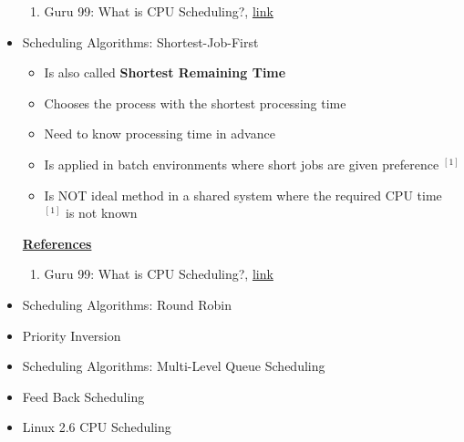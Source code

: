 \documentclass[12pt]{article}
\begin{document}
\begin{itemize}
    \begin{enumerate}[1)]
        \item Guru 99: What is CPU Scheduling?, \href{https://www.guru99.com/cpu-scheduling-algorithms.html#8}{link}
    \end{enumerate}

    \item Scheduling Algorithms: Shortest-Job-First
    \begin{itemize}
        \item Is also called \textbf{Shortest Remaining Time}
        \item Chooses the process with the shortest processing time
        \item Need to know processing time in advance
        \item Is applied in batch environments where short jobs are given preference $^{[1]}$
        \item Is NOT ideal method in a shared system where the required CPU time $^{[1]}$
        is not known
    \end{itemize}

    \bigskip

    \underline{\textbf{References}}

    \begin{enumerate}[1)]
        \item Guru 99: What is CPU Scheduling?, \href{https://www.guru99.com/cpu-scheduling-algorithms.html#8}{link}
    \end{enumerate}

    \item Scheduling Algorithms: Round Robin
    \item Priority Inversion
    \item Scheduling Algorithms: Multi-Level Queue Scheduling
    \item Feed Back Scheduling
    \item Linux 2.6 CPU Scheduling
\end{itemize}
\end{document}
